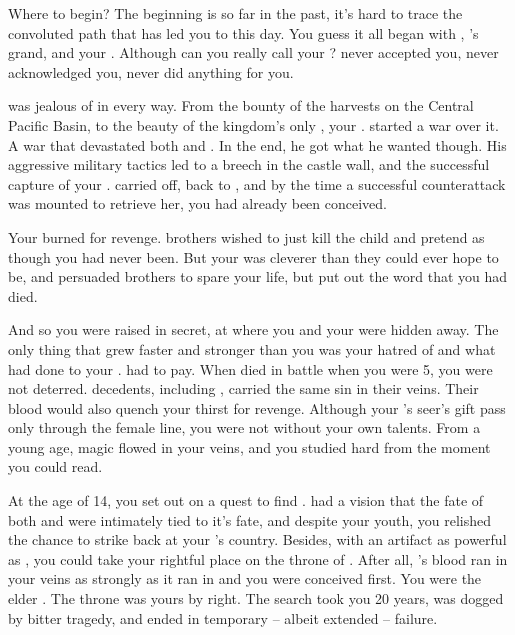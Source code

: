 \documentclass[char]{NeptuneBall}
\begin{document}
\name{\cManta{}}



Where to begin? The beginning is so far in the past, it's hard to trace the convoluted path that has led you to this day. You guess it all began with \cExExKing{\King} \cExExKing{}, \cExExKing{\King} \cKing{}'s grand\cExExKing{\parent}, and your \cExExKing{\parent}. Although can you really call \cExExKing{\them} your \cExExKing{\parent}? \cExExKing{\They} never accepted you, never acknowledged you, never did anything for you.

\cExExKing{\They} was jealous of \pPacifica{} in every way. From the bounty of the harvests on the Central Pacific Basin, to the beauty of the kingdom's only \cMother{\prince}, your \cMother{\parent} \cMother{\MYname}. \cExExKing{} started a war over it. A war that devastated both \pPacifica{} and \pAtlantis{}. In the end, he got what he wanted though. His aggressive military tactics led to a breech in the castle wall, and the successful capture of your \cMother{\parent}. \cExExKing{} carried \cMother{\them} off, back to \pAtlantis{}, and by the time a successful counterattack was mounted to retrieve her, you had already been conceived.

Your \cMother{\parent} burned for revenge. \cMother{\Them} brothers wished to just kill the child and pretend as though you had never been. But your \cMother{\parent} was cleverer than they could ever hope to be, and persuaded \cMother{\them} brothers to spare your life, but put out the word that you had died.

And so you were raised in secret, at \pAssassin{} where you and your \cMother{\parent} were hidden away. The only thing that grew faster and stronger than you was your hatred of \pAtlantis{} and what \cExExKing{} had done to your \cMother{\parent}. \cExExKing{} had to pay. When \cExExKing{\they} died in battle when you were 5, you were not deterred. \cExExKing{\Their} decedents, including \cExKing{}, carried the same sin in their veins. Their blood would also quench your thirst for revenge. Although your \cMother{\parent}'s seer's gift pass only through the female line, you were not without your own talents. From a young age, magic flowed in your veins, and you studied hard from the moment you could read.

At the age of 14, you set out on a quest to find \iTrident{\MYname}. \cMother{} had a vision that the fate of both \pPacifica{} and \pAtlantis{} were intimately tied to it's fate, and despite your youth, you relished the chance to strike back at your \cExExKing{\parent}'s country. Besides, with an artifact as powerful as \iTrident{\MYname}, you could take your rightful place on the throne of \pAtlantis{}. After all, \cExExKing{}'s blood ran in your veins as strongly as it ran in \cExKing{} and you were conceived first. You were the elder \cManta{\offspring}. The throne was yours by right. The search took you 20 years, was dogged by bitter tragedy, and ended in temporary -- albeit extended -- failure. 
\end{document}
